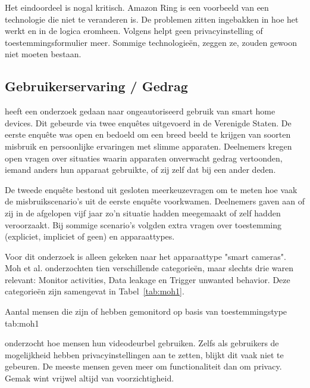 \documentclass[nonacm, sigconf, balance=true]{acmart}
\begin{document}
    \noindent Het eindoordeel is nogal kritisch.
    Amazon Ring is een voorbeeld van een technologie die niet te veranderen is.
    De problemen zitten ingebakken in hoe het werkt en in de logica eromheen.
    Volgens \parencite{selinger2022amazon} helpt geen privacyinstelling of toestemmingsformulier meer.
    Sommige technologieën, zeggen ze, zouden gewoon niet moeten bestaan.

    \subsection{Gebruikerservaring / Gedrag}\label{subsec:gebruikerservaring-/-gedrag2}

    \parencite{moh2023characterizing} heeft een onderzoek gedaan naar ongeautoriseerd gebruik van smart home devices.
    Dit gebeurde via twee enquêtes uitgevoerd in de Verenigde Staten.
    De eerste enquête was open en bedoeld om een breed beeld te krijgen van soorten misbruik en persoonlijke ervaringen met slimme apparaten.
    Deelnemers kregen open vragen over situaties waarin apparaten onverwacht gedrag vertoonden, iemand anders hun apparaat gebruikte, of zij zelf dat bij een ander deden.

    De tweede enquête bestond uit gesloten meerkeuzevragen om te meten hoe vaak de misbruikscenario's uit de eerste enquête voorkwamen.
    Deelnemers gaven aan of zij in de afgelopen vijf jaar zo'n situatie hadden meegemaakt of zelf hadden veroorzaakt.
    Bij sommige scenario's volgden extra vragen over toestemming (expliciet, impliciet of geen) en apparaattypes.

    Voor dit onderzoek is alleen gekeken naar het apparaattype "smart cameras".
    Moh et al. onderzochten tien verschillende categorieën, maar slechts drie waren relevant: Monitor activities, Data leakage en Trigger unwanted behavior.
    Deze categorieën zijn samengevat in Tabel~\ref{tab:moh1}.

    \begin{SimpleTable}[s{0.3}s{0.3}s{0.3}s{0.3}]{Aantal mensen die zijn of hebben gemonitord op basis van toestemmingstype \parencite{moh2023characterizing}}{tab:moh1}
        \TableEmpty{}
    \end{SimpleTable}

    \parencite{tabassum2023exploring} onderzocht hoe mensen hun videodeurbel gebruiken.
    Zelfs als gebruikers de mogelijkheid hebben privacyinstellingen aan te zetten, blijkt dit vaak niet te gebeuren.
    De meeste mensen geven meer om functionaliteit dan om privacy.
    Gemak wint vrijwel altijd van voorzichtigheid.
\end{document}
